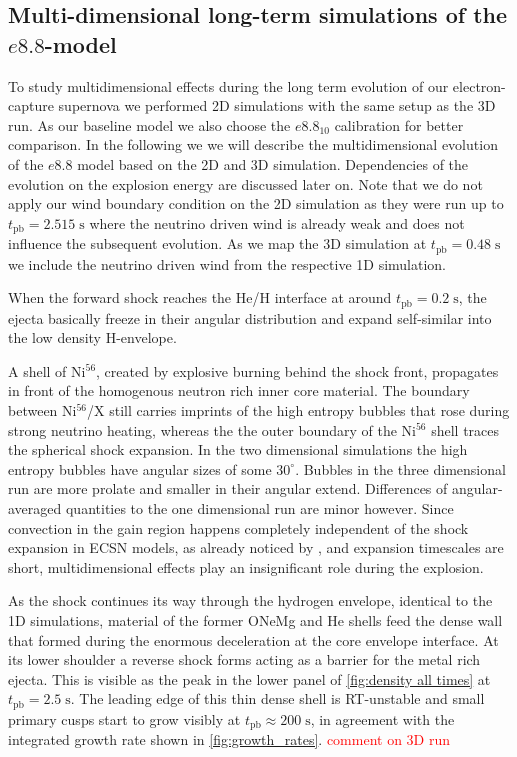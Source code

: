 \documentclass[fleqn,usenatbib]{mnras}
\newcommand{\nickel}{$\mathrm{Ni^{56}}$\xspace}
\newcommand{\tracer}{$\mathrm{X}$\xspace}
\begin{document}
\subsection{Multi-dimensional long-term simulations of the $e8.8$-model}
To study multidimensional effects during the long term evolution of our electron-capture supernova we performed 2D simulations with the same setup as the 3D run. As our baseline model we also choose the $e8.8_{10}$ calibration for better comparison. In the following we we will describe the multidimensional evolution of the $e8.8$ model based on the 2D and 3D simulation. Dependencies of the evolution on the explosion energy are discussed later on.
Note that we do not apply our wind boundary condition on the 2D simulation as they were run up to $t_{\mathrm{pb}}=2.515\;\mathrm{s}$ where the neutrino driven wind is already weak and does not influence the subsequent evolution. As we map the 3D simulation at $t_{\mathrm{pb}}=0.48\;\mathrm{s}$ we include the neutrino driven wind from the respective 1D simulation.

When the forward shock reaches the He/H interface at around $t_{\mathrm{pb}}=0.2\;\mathrm{s}$, the ejecta basically freeze in their angular distribution and expand self-similar into the low density H-envelope. 

A shell of \nickel, created by explosive burning behind the shock front, propagates in front of the homogenous neutron rich inner core material. The boundary between \nickel/\tracer still carries imprints of the high entropy bubbles that rose during strong neutrino heating, whereas the the outer boundary of the \nickel shell traces the spherical shock expansion. In the two dimensional simulations the high entropy bubbles have angular sizes of some $30^{\circ}$. Bubbles in the three dimensional run are more prolate and smaller in their angular extend. 
Differences of angular-averaged quantities to the one dimensional run are minor however. Since convection in the gain region happens completely independent of the shock expansion in ECSN models, as already noticed by \citet{Janka2007}, and expansion timescales are short, multidimensional effects play an insignificant role during the explosion. 

As the shock continues its way through the hydrogen envelope, identical to the 1D simulations, material of the former ONeMg and He shells feed the dense wall that formed during the enormous deceleration at the core envelope interface. At its lower shoulder a reverse shock forms acting as a barrier for the metal rich ejecta. This is visible as the peak in the lower panel of \autoref{fig:density all times} at $t_{\mathrm{pb}}=2.5\;\mathrm{s}$. The leading edge of this thin dense shell is RT-unstable and small primary cusps start to grow visibly at $t_{\mathrm{pb}}\approx 200\;\mathrm{s}$, in agreement with the integrated growth rate shown in \autoref{fig:growth_rates}. 
\textcolor{red}{comment on 3D run}
\end{document}
